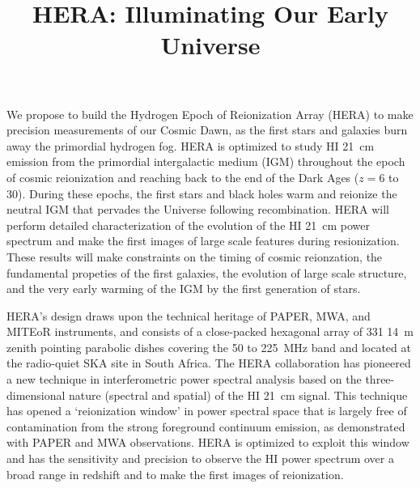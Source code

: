 \documentclass[preprint]{aastex}
\def\HI{{H{\small I }}}
\begin{document}
\pagestyle{empty}

\title{HERA: Illuminating Our Early Universe}


We propose to build the Hydrogen Epoch of Reionization Array (HERA) to make precision measurements of our Cosmic Dawn, as the first stars and galaxies burn away the primordial hydrogen fog. HERA is optimized to study \HI 21~cm emission from the primordial intergalactic medium (IGM) throughout the epoch
of cosmic reionization and reaching back to the end of the Dark Ages ($z = 6$ to 30). During these epochs, the first stars and 
black holes warm and reionize the neutral IGM that pervades the Universe following recombination. 
HERA will perform detailed characterization of the evolution of the \HI 21~cm power spectrum and make the first images of large scale features during resionization. 
These results will make constraints on the timing of cosmic reionzation, 
the fundamental propeties of the first galaxies, the evolution
of large scale structure, and the very early warming of the IGM by the first generation of stars. 

HERA's design draws upon the technical heritage of PAPER, MWA, and MITEoR instruments, and consists of a close-packed hexagonal array of 331 14~m zenith pointing parabolic dishes covering the 50 to 225~MHz band and located at the radio-quiet SKA site in South Africa. The HERA collaboration has pioneered a new technique in interferometric power spectral
analysis based on the three-dimensional nature (spectral and spatial) of the
\HI 21~cm signal. This technique has opened a `reionization window' in power spectral space that is 
largely free of contamination from the strong foreground continuum emission, as demonstrated with PAPER
and MWA observations. HERA is optimized to 
exploit this window and has the sensitivity and precision to observe the \HI power spectrum over a broad range in redshift and to make the first images of reionization. 

\end{document}

